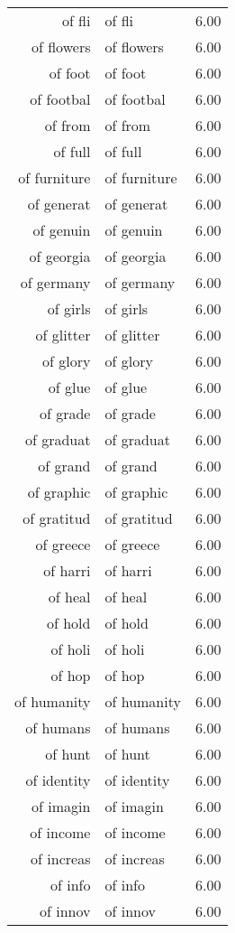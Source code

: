 \begin{table}[ht]
\begin{tabular}{rlr}
  of fli & of fli & 6.00 \\ 
  of flowers & of flowers & 6.00 \\ 
  of foot & of foot & 6.00 \\ 
  of footbal & of footbal & 6.00 \\ 
  of from & of from & 6.00 \\ 
  of full & of full & 6.00 \\ 
  of furniture & of furniture & 6.00 \\ 
  of generat & of generat & 6.00 \\ 
  of genuin & of genuin & 6.00 \\ 
  of georgia & of georgia & 6.00 \\ 
  of germany & of germany & 6.00 \\ 
  of girls & of girls & 6.00 \\ 
  of glitter & of glitter & 6.00 \\ 
  of glory & of glory & 6.00 \\ 
  of glue & of glue & 6.00 \\ 
  of grade & of grade & 6.00 \\ 
  of graduat & of graduat & 6.00 \\ 
  of grand & of grand & 6.00 \\ 
  of graphic & of graphic & 6.00 \\ 
  of gratitud & of gratitud & 6.00 \\ 
  of greece & of greece & 6.00 \\ 
  of harri & of harri & 6.00 \\ 
  of heal & of heal & 6.00 \\ 
  of hold & of hold & 6.00 \\ 
  of holi & of holi & 6.00 \\ 
  of hop & of hop & 6.00 \\ 
  of humanity & of humanity & 6.00 \\ 
  of humans & of humans & 6.00 \\ 
  of hunt & of hunt & 6.00 \\ 
  of identity & of identity & 6.00 \\ 
  of imagin & of imagin & 6.00 \\ 
  of income & of income & 6.00 \\ 
  of increas & of increas & 6.00 \\ 
  of info & of info & 6.00 \\ 
  of innov & of innov & 6.00 \\ 

\end{tabular}
\end{table}
